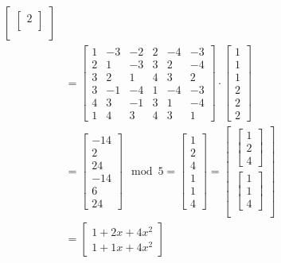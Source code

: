 \begin{align*}
{\begin{bmatrix}
\begin{bmatrix}
      2 \\
    \end{bmatrix} \\
  \end{bmatrix}
  }                      \\
                  & = {
  \begin{bmatrix}
    1 & -3 & -2 & 2 & -4 & -3  \\
    2 & 1  & -3 & 3 & 2  & -4  \\
    3 & 2  & 1  & 4 & 3  & 2   \\
    3 & -1 & -4 & 1 & -4 & -3  \\
    4 & 3  & -1 & 3 & 1  & -4  \\
    1 & 4  & 3  & 4 & 3  & 1 
  \end{bmatrix}
  \cdot
  \begin{bmatrix}
    1 \\
    1 \\
    1 \\
    2 \\
    2 \\
    2 
  \end{bmatrix}
  }                      \\
                  & = {
  \begin{bmatrix}
    -14 \\
    2   \\
    24  \\
    -14 \\
    6   \\
    24
  \end{bmatrix}
  \mod 5
  }
  = {
  \begin{bmatrix}
    1 \\
    2 \\
    4 \\
    1 \\
    1 \\
    4
  \end{bmatrix}
  }
  = {
  \begin{bmatrix}
    \begin{bmatrix}
      1 \\
      2 \\
      4
    \end{bmatrix} \\
    \begin{bmatrix}
      1 \\
      1 \\
      4
    \end{bmatrix} \\
  \end{bmatrix}
  }                      \\
                  & = {
  \begin{bmatrix}
    1+2x+4x^2 \\
    1+1x+4x^2
  \end{bmatrix}
  }
\end{align*}


